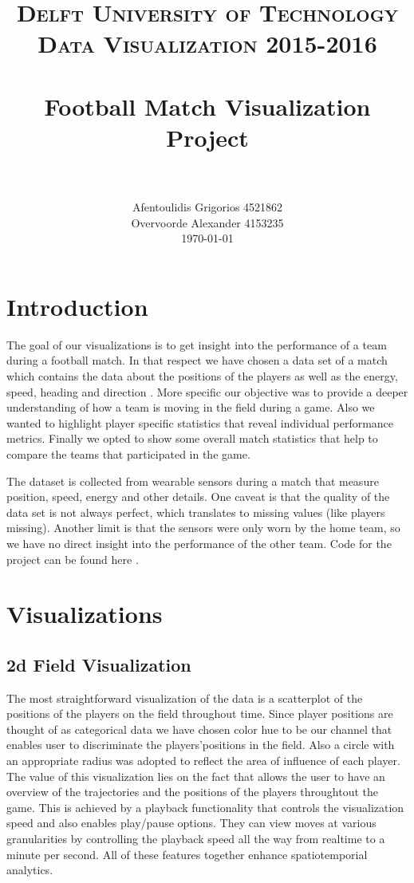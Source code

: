 \documentclass{article}
\title{ 	
		\usefont{OT1}{bch}{b}{n}
		\normalfont \normalsize \textsc{Delft University of Technology \protect\\ Data Visualization 2015-2016} \\ [25pt]
		\horrule{0.5pt} \\[0.4cm]
		\huge Football Match Visualization Project \\
		\horrule{2pt} \\[0.5cm]
}
\author{
		\normalfont 								\normalsize
        Afentoulidis Grigorios 4521862\\[-3pt]		\normalsize
        Overvoorde Alexander 4153235 \\
        \today
}
\date{}
\begin{document}
\lstset{language=Prolog}
\maketitle

\section{Introduction}
The goal of our visualizations is to get insight into the performance of a team during a football match. In that respect we have chosen a data set of a match which contains the data about the positions of the players as well as the energy, speed, heading and direction \cite{data}. More specific our objective was to provide a deeper understanding of how a team is moving in the field during a game. Also we wanted to highlight player specific statistics that reveal individual performance metrics. Finally we opted to show some overall match statistics that help to compare the teams that participated in the game.

The dataset is collected from wearable sensors during a match that measure position, speed, energy and other details. One caveat is that the quality of the data set is not always perfect, which translates to missing values (like players missing). Another limit is that the sensors were only worn by the home team, so we have no direct insight into the performance of the other team. Code for the project can be found here \cite{code}.

\section{Visualizations}
\subsection{2d Field Visualization}
The most straightforward visualization of the data is a scatterplot of the positions of the players on the field throughout time. Since player positions are thought of as categorical data we have chosen color hue to be our channel that enables user to discriminate the players\textquoteright  positions in the field. Also a circle with an appropriate radius was adopted to reflect the area of influence of each player. The value of this visualization lies on the fact that allows the user to have an overview of the trajectories and the positions of the players throughtout the game. This is achieved by a playback functionality that controls the visualization speed and also enables play/pause options.  They can view moves at various granularities by controlling the playback speed all the way from realtime to a minute per second. All of these features together enhance spatiotemporial analytics.
\end{document}
